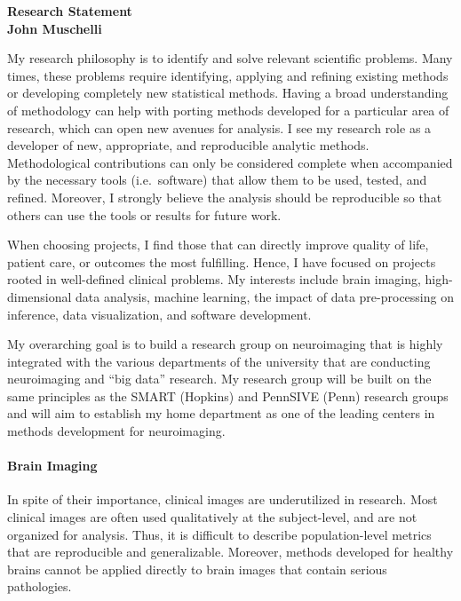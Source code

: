 \documentclass[12pt,a4paper]{article}
\author{John Muschelli}
\begin{document}
\thispagestyle{empty}

\begin{center}
{\bf
{\large Research Statement }\\
John Muschelli
}
\end{center}

My research philosophy is to identify and solve relevant scientific problems.  Many times, these problems require identifying, applying and refining existing methods or developing completely new statistical methods.  Having a broad understanding of methodology can help with porting methods developed for a particular area of research, which can open new avenues for analysis.  I see my research role as a developer of new, appropriate, and reproducible analytic methods.  Methodological contributions can only be considered complete when accompanied by the necessary tools (i.e.~software) that allow them to be used, tested, and refined.
Moreover, I strongly believe the analysis should be reproducible so that others can use the tools or results for future work.  


When choosing projects, I find those that can directly improve quality of life, patient care, or outcomes the most fulfilling.  Hence, I have focused on projects rooted in well-defined clinical problems.  My interests include brain imaging, high-dimensional data analysis, machine learning, the impact of data pre-processing on inference, data visualization, and software development.  


My overarching goal is to build a research group on neuroimaging that is highly integrated with the various departments of the university that are conducting neuroimaging and ``big data'' research. My research group will be built on the same principles as the SMART (Hopkins) and PennSIVE (Penn) research groups and will aim to establish my home department as one of the leading centers in methods development for neuroimaging.

\paragraph{Brain Imaging} In spite of their importance, clinical images are underutilized in research.  Most clinical images are often used qualitatively at the subject-level, and are not organized for analysis.  Thus, it is difficult to describe population-level metrics that are reproducible and generalizable. Moreover, methods developed for healthy brains cannot be applied directly to brain images that contain serious pathologies. 
\end{document}
